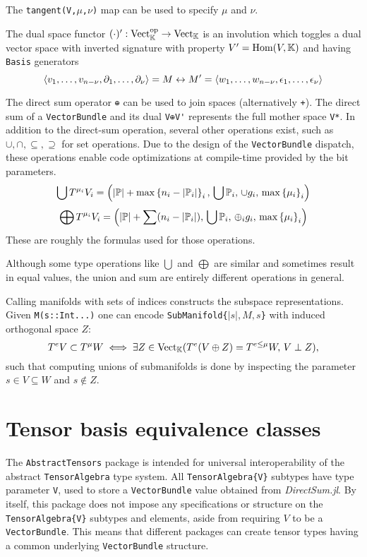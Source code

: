 \documentclass{juliacon}
\begin{document}
	The \verb`tangent(V,`$\mu$\verb`,`$\nu$\verb`)` map can be used to specify $\mu$ and $\nu$.

	The dual space functor $(\cdot)':\text{Vect}_{\mathbb{K}}^\text{op}\rightarrow\text{Vect}_{\mathbb{K}}$
	is an involution which toggles a dual vector space with inverted signature with property $V' = \text{Hom}(V,\mathbb{K})$ and having \verb`Basis` generators
	$$\left\langle v_1,\dots,v_{n-\nu},\partial_1,\dots,\partial_\nu \right\rangle=M\leftrightarrow M' = \left\langle w_1,\dots,w_{n-\nu},\epsilon_1,\dots,\epsilon_\nu \right\rangle$$

	The direct sum operator \verb`⊕` can be used to join spaces (alternatively \verb`+`).
	The direct sum of a \verb`VectorBundle` and its dual \verb`V⊕V'` represents the full mother space \verb`V*`.
	In addition to the direct-sum operation, several other operations exist, such as $\cup,\cap,\subseteq,\supseteq$ for set operations.
	Due to the design of the \verb`VectorBundle` dispatch, these operations enable code optimizations at compile-time provided by the bit parameters.
	$$ \bigcup T^{\mu_i}V_i = \left(|\mathbb{P}|+\max\left\{ n_i-|\mathbb{P}_i| \right\}_i,\, \bigcup \mathbb{P}_i,\, \cup g_i,\, \max\left\{ \mu_i \right\}_i\right) $$
	$$ \bigoplus T^{\mu_i}V_i = \left(\left|\mathbb{P}\right|+\sum (n_i-|\mathbb{P}_i|),\, \bigcup \mathbb{P}_i,\, \oplus_i g_i,\,\max\left\{ \mu_i \right\}_i\right) $$
	These are roughly the formulas used for those operations.
\begin{remark}
	Although some type operations like $\bigcup$ and $\bigoplus$ are similar and sometimes result in equal values, the union and sum are entirely different operations in general.
\end{remark}

Calling manifolds with sets of indices constructs the subspace representations.
Given \verb`M(s::Int...)` one can encode \verb+SubManifold{+$|s|,M,s$\verb+}+ with induced orthogonal space $Z$:
$$T^eV \subset T^\mu W \iff \exists Z\in\text{Vect}_{\mathbb{K}}(T^e(V\oplus Z) = T^{e\leq \mu}W,\,V\perp Z),$$
such that computing unions of submanifolds is done by inspecting the parameter $s\in V\subseteq W$ and $s\notin Z$.

\section{Tensor basis equivalence classes}%

The \verb`AbstractTensors` package is intended for universal interoperability of the abstract \verb`TensorAlgebra` type system.
All \verb`TensorAlgebra{V}` subtypes have type parameter \verb`V`, used to store a \verb`VectorBundle` value obtained from \textit{DirectSum.jl}.
By itself, this package does not impose any specifications or structure on the \verb`TensorAlgebra{V}` subtypes and elements, aside from requiring $V$ to be a \verb`VectorBundle`.
This means that different packages can create tensor types having a common underlying \verb`VectorBundle` structure.
\end{document}
